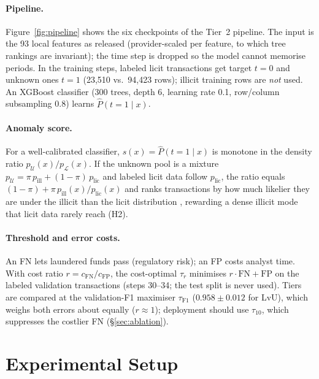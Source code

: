 \documentclass[11pt]{article}
\newcommand{\ours}{LvU}
\begin{document}
\paragraph{Pipeline.}
Figure~\ref{fig:pipeline} shows the six checkpoints of the Tier~2 pipeline.
The input is the 93 local features as released (provider-scaled per feature, to which tree rankings are invariant); the time step is dropped so the model cannot memorise periods.
In the training steps, labeled licit transactions get target $t=0$ and unknown ones $t=1$ (23,510 vs.\ 94,423 rows); illicit training rows are \emph{not} used.
An XGBoost classifier (300 trees, depth 6, learning rate 0.1, row/column subsampling 0.8) learns $\hat{P}(t{=}1\mid x)$.

\paragraph{Anomaly score.}
For a well-calibrated classifier, $s(x)=\hat{P}(t{=}1\mid x)$ is monotone in the density ratio $p_{\mathcal{U}}(x)/p_{\mathcal{L}}(x)$.
If the unknown pool is a mixture $p_{\mathcal{U}}=\pi\,p_{\text{ill}}+(1-\pi)\,p_{\text{lic}}$ and labeled licit data follow $p_{\text{lic}}$, the ratio equals $(1-\pi)+\pi\,p_{\text{ill}}(x)/p_{\text{lic}}(x)$ and ranks transactions by how much likelier they are under the illicit than the licit distribution \citep{elkan2008pu}, rewarding a dense illicit mode that licit data rarely reach (H2).

\paragraph{Threshold and error costs.}
An FN lets laundered funds pass (regulatory risk); an FP costs analyst time.
With cost ratio $r=c_{\mathrm{FN}}/c_{\mathrm{FP}}$, the cost-optimal $\tau_r$ minimises $r\cdot\mathrm{FN}+\mathrm{FP}$ on the labeled validation transactions (steps 30--34; the test split is never used).
Tiers are compared at the validation-F1 maximiser $\tau_{\mathrm{F1}}$ ($0.958\pm0.012$ for \ours{}), which weighs both errors about equally ($r\approx1$); deployment should use $\tau_{10}$, which suppresses the costlier FN (\S\ref{sec:ablation}).

\section{Experimental Setup}
\label{sec:setup}
\end{document}
